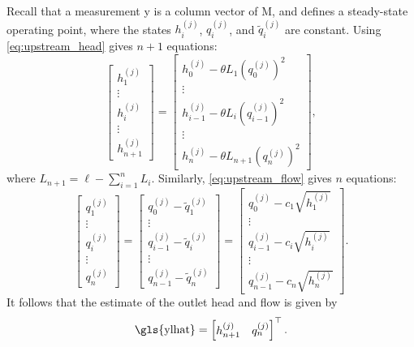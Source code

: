 Recall that a measurement \gls{y} is a column vector of \gls{M}, and defines a steady-state operating point, where the states $h^{(j)}_i$, $q^{(j)}_i$, and $\tilde{q}^{(j)}_i$ are constant. Using \cref{eq:upstream_head} gives $n+1$ equations:
\begin{equation}
\label{eq:phi_h}
    \begin{bmatrix}
    h_1^{(j)}\\[0.3em]
    \vdots\\[0.3em]
    h_i^{(j)}\\[0.3em]
    \vdots\\[0.3em]
    h_{n+1}^{(j)}
    \end{bmatrix}
    =
    \begin{bmatrix}
    h_0^{(j)}-\theta L_1 \left(q_0^{(j)}\right)^2\\
    \vdots\\
    h_{i-1}^{(j)}-\theta L_{i} \left(q_{i-1}^{(j)}\right)^2\\
    \vdots\\
    h_{n}^{(j)}-\theta L_{n+1} \left(q_{n}^{(j)}\right)^2
    \end{bmatrix},
\end{equation}
where $L_{n+1}=\ell-\sum_{i=1}^n L_i$. Similarly, \cref{eq:upstream_flow} gives $n$ equations:
\begin{equation}
\label{eq:phi_q}
    \begin{bmatrix}
    q_1^{(j)}\\[0.2em]
    \vdots\\[0.2em]
    q_i^{(j)}\\[0.2em]
    \vdots\\[0.2em]
    q_{n}^{(j)}
    \end{bmatrix}
    =
    \begin{bmatrix}
    q_0^{(j)}-\tilde{q}^{(j)}_1\\[0.2em]
    \vdots\\[0.2em]
    q_{i-1}^{(j)}-\tilde{q}^{(j)}_{i}\\[0.2em]
    \vdots\\[0.2em]
    q_{n-1}^{(j)}-\tilde{q}^{(j)}_{n}
    \end{bmatrix}
    =
    \begin{bmatrix}
    q_0^{(j)} - c_1 \sqrt{h_1^{(j)}}\\
    \vdots\\
    q_{i-1}^{(j)} - c_{i} \sqrt{h_{i}^{(j)}}\\
    \vdots\\
    q_{n-1}^{(j)} - c_{n} \sqrt{h_{n}^{(j)}}
    \end{bmatrix}.
\end{equation}
It follows that the estimate of the outlet head and flow is given by 
\begin{equation}
\label{eq:yhat}
    \text{\gls{ylhat}} = \begin{bmatrix}
        h_{n+1}^{(j)} & q_n^{(j)}
    \end{bmatrix}^\top.
\end{equation}


